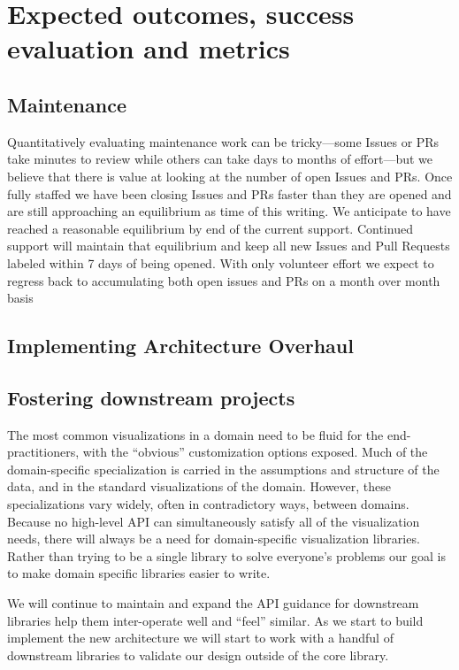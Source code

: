 \documentclass[12pt,letterpaper]{article}  %
\begin{document}
\section{Expected outcomes, success evaluation and metrics}
\subsection{Maintenance}

Quantitatively evaluating maintenance work can be tricky---some Issues
or PRs take minutes to review while others can take days to months of
effort---but we believe that there is value at looking at the number
of open Issues and PRs.  Once fully staffed we have been closing
Issues and PRs faster than they are opened and are still approaching
an equilibrium as time of this writing.  We anticipate to have reached
a reasonable equilibrium by end of the current support.  Continued
support will maintain that equilibrium and keep all new Issues and
Pull Requests labeled within 7 days of being opened.  With only
volunteer effort we expect to regress back to accumulating both open
issues and PRs on a month over month basis

\subsection{Implementing Architecture Overhaul}


\subsection{Fostering downstream projects}
\label{sec:downstream}

The most common visualizations in a domain need to be fluid for the
end-practitioners, with the ``obvious'' customization options exposed.
Much of the domain-specific specialization is carried in the
assumptions and structure of the data, and in the standard
visualizations of the domain.  However, these specializations vary
widely, often in contradictory ways, between domains.  Because no
high-level API can simultaneously satisfy all of the visualization
needs, there will always be a need for domain-specific visualization
libraries.  Rather than trying to be a single library to solve
everyone's problems our goal is to make domain specific libraries
easier to write.

We will continue to maintain and expand the API guidance for
downstream libraries help them inter-operate well and ``feel''
similar.  As we start to build implement the new architecture
we will start to work with a handful of downstream
libraries to validate our design outside of the core library.
\end{document}
